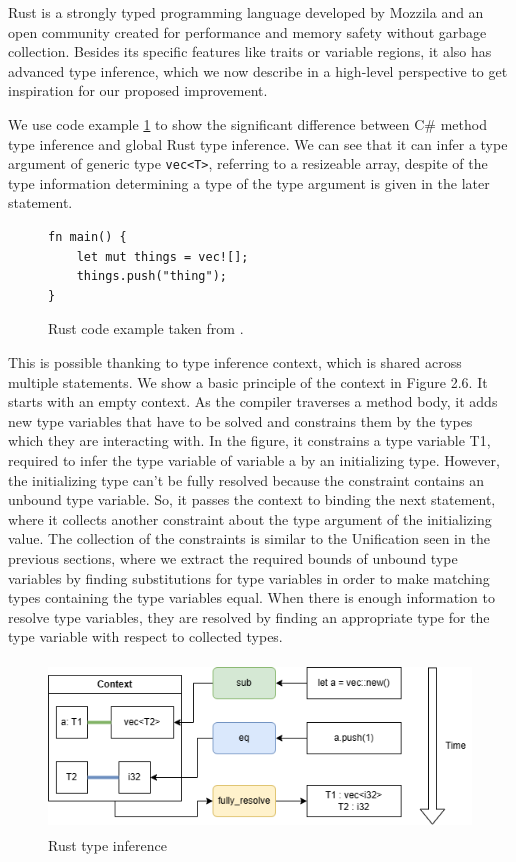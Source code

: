 Rust is a strongly typed programming language developed by Mozzila and an open community created for performance and memory safety without garbage collection. 
Besides its specific features like traits or variable regions, it also has advanced type inference, which we now describe in a high-level perspective to get inspiration for our proposed improvement.
\par
{}
We use code example \ref{img58:rustCodeExample} to show the significant difference between C\# method type inference and global Rust type inference.
We can see that it can infer a type argument of generic type \texttt{vec<T>}, referring to a resizeable array, despite of the type information determining a type of the type argument is given in the later statement.
\begin{figure}
\begin{lstlisting}
fn main() {
    let mut things = vec![];
    things.push("thing");
}
\end{lstlisting}
\caption{Rust code example taken from \cite{online:rustTypeInference}.}
\label{img58:rustCodeExample}
\end{figure}
\par
This is possible thanking to type inference context, which is shared across multiple statements. 
We show a basic principle of the context in Figure 2.6. 
It starts with an empty context. 
As the compiler traverses a method body, it adds new type variables that have to be solved and constrains them by the types which they are interacting with. 
In the figure, it constrains a type variable T1, required to infer the type variable of variable a by an initializing type. 
However, the initializing type can't be fully resolved because the constraint contains an unbound type variable. 
So, it passes the context to binding the next statement, where it collects another constraint about the type argument of the initializing value. 
The collection of the constraints is similar to the Unification seen in the previous sections, where we extract the required bounds of unbound type variables by finding substitutions for type variables in order to make matching types containing the type variables equal.
When there is enough information to resolve type variables, they are resolved by finding an appropriate type for the type variable with respect to collected types.
\par
\begin{figure}
\centering
\includegraphics[width=120mm, height=45mm]{./img/RustTypeInference.png}
\caption{Rust type inference}
\label{img57:rustTypeInference}
\end{figure}
